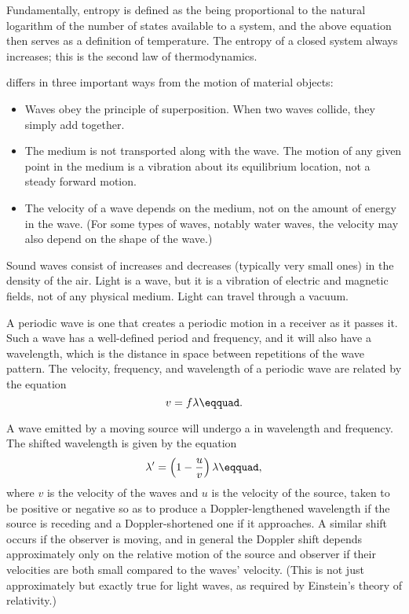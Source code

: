 	Fundamentally, entropy is defined as the being proportional
	to the natural logarithm of the number of states available
	to a system, and the above equation then serves as a
	definition of temperature. The entropy of a closed
	system always increases; this is the second law of thermodynamics.


	 differs in three important ways from the motion
	of material objects:
	
	\begin{itemize}
	\item[] Waves obey the principle of superposition. When two
	waves collide, they simply add together.
	
	\item[] The medium is not transported along with the wave. The
	motion of any given point in the medium is a vibration about
	its equilibrium location, not a steady forward motion.
	
	\item[] The velocity of a wave depends on the medium, not on the
	amount of energy in the wave. (For some types of waves,
	notably water waves, the velocity may also depend on
	the shape of the wave.)
	\end{itemize}
	
	Sound waves consist of increases and decreases (typically
	very small ones) in the density of the air. Light is a wave,
	but it is a vibration of electric and magnetic fields, not
	of any physical medium. Light can travel through a vacuum.
	
	A periodic wave is one that creates a periodic motion in a
	receiver as it passes it. Such a wave has a well-defined
	period and frequency, and it will also have a wavelength,
	which is the distance in space between repetitions of the
	wave pattern. The velocity, frequency, and wavelength of a
	periodic wave are related by the equation
	\begin{equation*}
			v  =  f \lambda\eqquad.  
	\end{equation*}
	
	A wave emitted by a moving source will undergo a  in
	wavelength and frequency. The shifted wavelength is
	given by the equation
	\begin{equation*}
		   \lambda' = \left(1-\frac{u}{v}\right)\lambda\eqquad,
	\end{equation*}
	where $v$ is the velocity of the waves and $u$ is the
	velocity of the source, taken to be positive or negative so
	as to produce a Doppler-lengthened wavelength if  the source
	is receding and a Doppler-shortened one if it approaches. A
	similar shift occurs if the observer is moving, and in
	general the Doppler shift depends approximately only on the
	relative motion of the source and observer if their
	velocities are both small compared to the waves' velocity.
	(This is not just approximately but exactly true for light
	waves, as required by Einstein's
	theory of relativity.)

